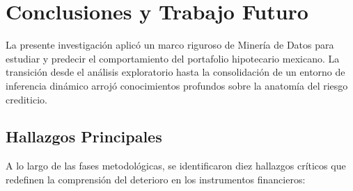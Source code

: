 \section{Conclusiones y Trabajo Futuro}

La presente investigación aplicó un marco riguroso de Minería de Datos para estudiar y predecir el comportamiento del portafolio hipotecario mexicano. La transición desde el análisis exploratorio hasta la consolidación de un entorno de inferencia dinámico arrojó conocimientos profundos sobre la anatomía del riesgo crediticio.

\subsection{Hallazgos Principales}

A lo largo de las fases metodológicas, se identificaron diez hallazgos críticos que redefinen la comprensión del deterioro en los instrumentos financieros:

